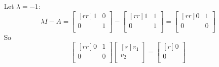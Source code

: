 \documentclass[12pt]{article}
\theoremstyle{definition}
\theoremstyle{plain}
\begin{document}
\begin{enumerate}
	Let $\lambda=-1$:\\
	\[ \lambda I-A = \begin{bmatrix}[rr]1&0\\0&1\\\end{bmatrix}-\begin{bmatrix}[rr]1&1\\0&1\\\end{bmatrix} = \begin{bmatrix}[rr]0&1\\0&0\\\end{bmatrix} \]
	So
	\[ \begin{bmatrix}[rr]0&1\\0&0\\\end{bmatrix}\begin{bmatrix}[r]v_1\\v_2\\\end{bmatrix} = \begin{bmatrix}[r]0\\0\\\end{bmatrix} \]
	

\end{enumerate}
\end{document}

